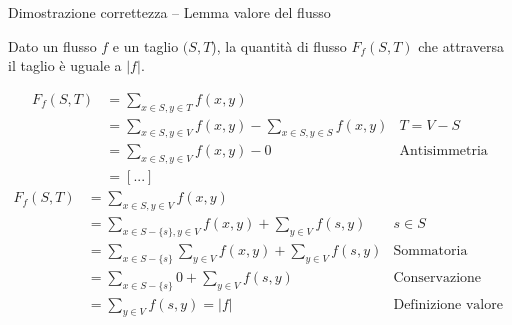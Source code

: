 \begin{frame}{Dimostrazione correttezza -- Lemma valore del flusso}
    
\vspace{-3pt}
\begin{myboxtitle}
Dato un flusso $f$ e un taglio $(S,T$), la quantità di flusso
$F_f(S,T)$ che attraversa il taglio è uguale a $|f|$.
\end{myboxtitle}

\small
\begin{overprint}
\begin{align*}
F_f(S,T) &= \sum_{x \in S, y \in T} f(x,y) \\
       &= \sum_{x \in S, y \in V} f(x,y) - \sum_{x \in S, y \in S} f(x,y)& T = V - S\\ 
       &= \sum_{x \in S, y \in V} f(x,y) - 0& \textrm{Antisimmetria}\\
       &= [...] 
\end{align*}
\begin{align*}
F_f(S,T) &= \sum_{x \in S, y \in V} f(x,y)& \\ 
       &= \sum_{x \in S-\{s\}, y \in V} f(x,y) + \sum_{y \in V} f(s,y) & s \in S\\ 
       &= \sum_{x \in S-\{s\}} \sum_{y \in V} f(x,y) + \sum_{y \in V} f(s,y) & \mathrm{Sommatoria}\\ 
       &= \sum_{x \in S-\{s\}} 0 + \sum_{y \in V} f(s,y) & \textrm{Conservazione flusso}\\ 
       &= \sum_{y \in V} f(s,y) = |f| & \textrm{Definizione valore flusso}
\end{align*}
\end{overprint}
        
\end{frame}




